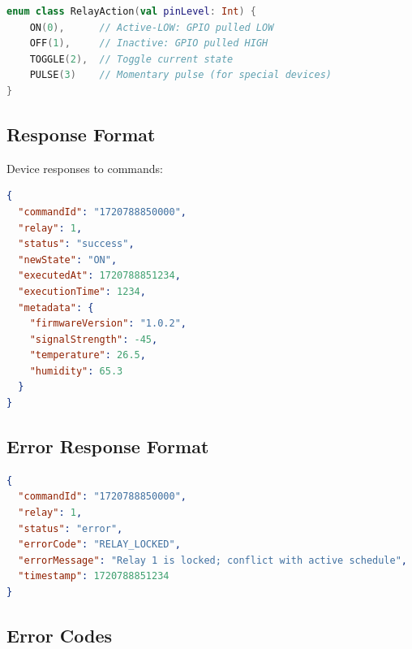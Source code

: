 \begin{lstlisting}[language=kotlin, caption=Relay Action Enum, label=lst:relay_actions]
enum class RelayAction(val pinLevel: Int) {
    ON(0),      // Active-LOW: GPIO pulled LOW
    OFF(1),     // Inactive: GPIO pulled HIGH
    TOGGLE(2),  // Toggle current state
    PULSE(3)    // Momentary pulse (for special devices)
}
\end{lstlisting}

\subsection{Response Format}

Device responses to commands:

\begin{lstlisting}[language=json, caption=Command Response Format, label=lst:response_format]
{
  "commandId": "1720788850000",
  "relay": 1,
  "status": "success",
  "newState": "ON",
  "executedAt": 1720788851234,
  "executionTime": 1234,
  "metadata": {
    "firmwareVersion": "1.0.2",
    "signalStrength": -45,
    "temperature": 26.5,
    "humidity": 65.3
  }
}
\end{lstlisting}

\subsection{Error Response Format}

\begin{lstlisting}[language=json, caption=Error Response Format, label=lst:error_response]
{
  "commandId": "1720788850000",
  "relay": 1,
  "status": "error",
  "errorCode": "RELAY_LOCKED",
  "errorMessage": "Relay 1 is locked; conflict with active schedule",
  "timestamp": 1720788851234
}
\end{lstlisting}

\subsection{Error Codes}


